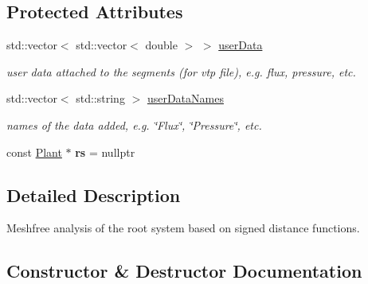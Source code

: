 \subsection*{Protected Attributes}
\begin{DoxyCompactItemize}
\item 
\mbox{\label{classCPlantBox_1_1SegmentAnalyser_a68ea16b452b6b65bdb3eff352d5a2341}} 
std\+::vector$<$ std\+::vector$<$ double $>$ $>$ \hyperlink{classCPlantBox_1_1SegmentAnalyser_a68ea16b452b6b65bdb3eff352d5a2341}{user\+Data}
\begin{DoxyCompactList}\small\item\em user data attached to the segments (for vtp file), e.\+g. flux, pressure, etc. \end{DoxyCompactList}\item 
\mbox{\label{classCPlantBox_1_1SegmentAnalyser_a77a045487660790d602c82821b8c8ec2}} 
std\+::vector$<$ std\+::string $>$ \hyperlink{classCPlantBox_1_1SegmentAnalyser_a77a045487660790d602c82821b8c8ec2}{user\+Data\+Names}
\begin{DoxyCompactList}\small\item\em names of the data added, e.\+g. \char`\"{}\+Flux\char`\"{}, \char`\"{}\+Pressure\char`\"{}, etc. \end{DoxyCompactList}\item 
\mbox{\label{classCPlantBox_1_1SegmentAnalyser_af6fac7a28aae94fa6bf39b21d1efb613}} 
const \hyperlink{classCPlantBox_1_1Plant}{Plant} $\ast$ {\bfseries rs} = nullptr
\end{DoxyCompactItemize}


\subsection{Detailed Description}
Meshfree analysis of the root system based on signed distance functions. 

\subsection{Constructor \& Destructor Documentation}
\mbox{\label{classCPlantBox_1_1SegmentAnalyser_aa90925db52f92b3875e19897a1319059}} 
